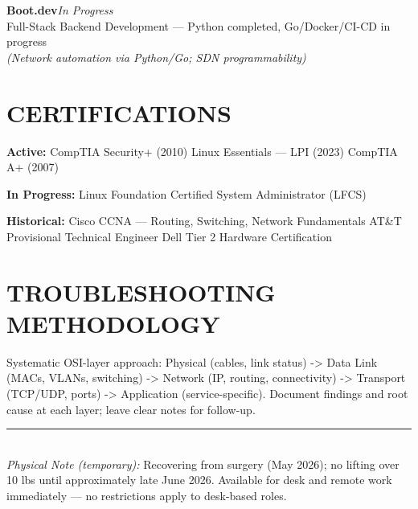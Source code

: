 \documentclass[9pt,letterpaper]{extarticle}
\begin{document}
\vspace{4pt}
\noindent\textbf{Boot.dev}\hfill\textit{In Progress}\\
Full-Stack Backend Development --- Python completed, Go/Docker/CI-CD in progress\\
\textit{(Network automation via Python/Go; SDN programmability)}

\section*{CERTIFICATIONS}

\textbf{Active:} CompTIA Security+ (2010) \textbullet{} Linux Essentials --- LPI (2023) \textbullet{} CompTIA A+ (2007)

\textbf{In Progress:} Linux Foundation Certified System Administrator (LFCS)

\textbf{Historical:} Cisco CCNA --- Routing, Switching, Network Fundamentals \textbullet{} AT\&T Provisional Technical Engineer \textbullet{} Dell Tier 2 Hardware Certification

\section*{TROUBLESHOOTING METHODOLOGY}

Systematic OSI-layer approach: Physical (cables, link status) -> Data Link (MACs, VLANs, switching) -> Network (IP, routing, connectivity) -> Transport (TCP/UDP, ports) -> Application (service-specific). Document findings and root cause at each layer; leave clear notes for follow-up.

\vspace{8pt}
\noindent\rule{\linewidth}{0.4pt}
\vspace{3pt}
\\[2pt]
{\small\textit{Physical Note (temporary):} Recovering from surgery (May 2026); no lifting over 10 lbs until approximately late June 2026. Available for desk and remote work immediately --- no restrictions apply to desk-based roles.}
\end{document}
